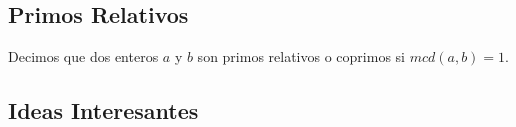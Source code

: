 \documentclass[12pt, fleqn]{report}                             %
\begin{document}
        \clearpage
        \subsection{Primos Relativos}

            Decimos que dos enteros $a$ y $b$ son primos relativos o coprimos si $mcd(a,b) = 1$.

        \subsection*{Ideas Interesantes}
\end{document}
